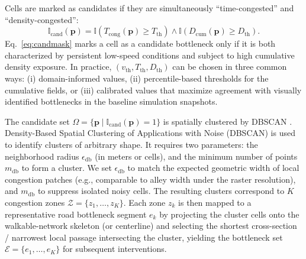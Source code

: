 \documentclass[preprint,12pt]{elsarticle}
\begin{document}
Cells are marked as candidates if they are simultaneously ``time-congested'' and ``density-congested'':
\begin{equation}
\mathbb{I}_{\mathrm{cand}}(\mathbf{p})
=
\mathbb{I}\!\left(T_{\mathrm{cong}}(\mathbf{p})\ge T_{\mathrm{th}}\right)
\wedge
\mathbb{I}\!\left(D_{\mathrm{cum}}(\mathbf{p})\ge D_{\mathrm{th}}\right).
\label{eq:candmask}
\end{equation}
Eq.~\eqref{eq:candmask} marks a cell as a candidate bottleneck only if it is both
characterized by persistent low-speed conditions and subject to high cumulative density exposure.
In practice, $(v_{\mathrm{th}}, T_{\mathrm{th}}, D_{\mathrm{th}})$
can be chosen in three common ways:
(i) domain-informed values,
(ii) percentile-based thresholds for the cumulative fields,
or (iii) calibrated values that maximize agreement with visually identified bottlenecks
in the baseline simulation snapshots.


The candidate set $\Omega=\{\mathbf{p}\mid \mathbb{I}_{\mathrm{cand}}(\mathbf{p})=1\}$ is spatially clustered by DBSCAN \citep{ester1996density}.
Density-Based Spatial Clustering of Applications with Noise (DBSCAN) is used to identify clusters of arbitrary shape. It requires two parameters: the neighborhood radius $\epsilon_{\mathrm{db}}$ (in meters or cells),
and the minimum number of points $m_{\mathrm{db}}$ to form a cluster.
We set $\epsilon_{\mathrm{db}}$ to match the expected geometric width of local congestion patches
(e.g., comparable to alley width under the raster resolution), and $m_{\mathrm{db}}$ to suppress isolated noisy cells.
The resulting clusters correspond to $K$ congestion zones $\mathcal{Z}=\{z_1,\ldots,z_K\}$.
Each zone $z_k$ is then mapped to a representative road bottleneck segment $e_k$ by projecting
the cluster cells onto the walkable-network skeleton (or centerline) and selecting the shortest
cross-section / narrowest local passage intersecting the cluster,
yielding the bottleneck set $\mathcal{E}=\{e_1,\ldots,e_K\}$ for subsequent interventions.
\end{document}
